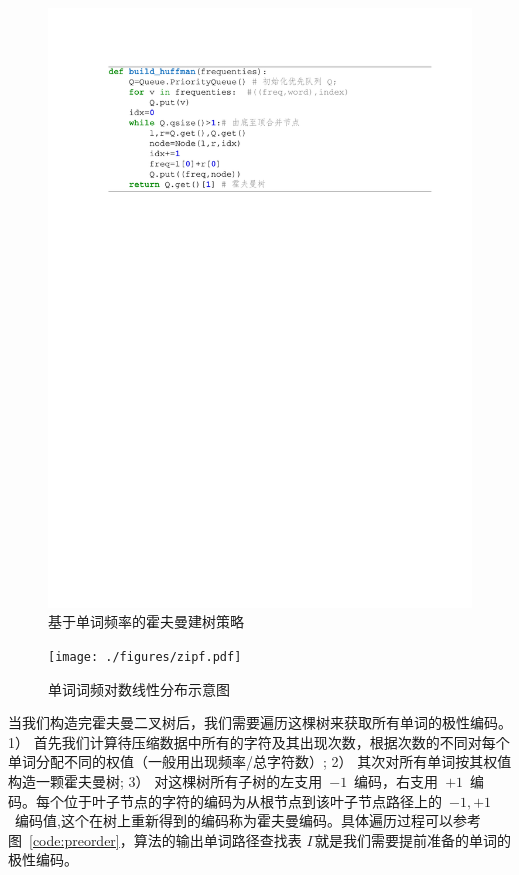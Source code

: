 \begin{figure}[!ht]
  \centering
\includegraphics[width=1\linewidth]{./figures/huffman.pdf}
\caption{基于单词频率的霍夫曼建树策略}\label{code:huffman}
\end{figure}

\begin{figure}[!ht]
  \centering
\texttt{[image: ./figures/zipf.pdf]}
\caption{单词词频对数线性分布示意图}\label{fig:zipf}
\setlength{\abovedisplayskip}{6pt}
\setlength{\belowdisplayskip}{6pt}
\end{figure}

当我们构造完霍夫曼二叉树后，我们需要遍历这棵树来获取所有单词的极性编码。1） 首先我们计算待压缩数据中所有的字符及其出现次数，根据次数的不同对每个单词分配不同的权值（一般用出现频率/总字符数）; 2） 其次对所有单词按其权值构造一颗霍夫曼树; 3） 对这棵树所有子树的左支用~$-1$~编码，右支用~$+1$~编码。每个位于叶子节点的字符的编码为从根节点到该叶子节点路径上的~$-1,+1$~编码值,这个在树上重新得到的编码称为霍夫曼编码。具体遍历过程可以参考图~\ref{code:preorder}，算法的输出单词路径查找表 $\Gamma$就是我们需要提前准备的单词的极性编码。


